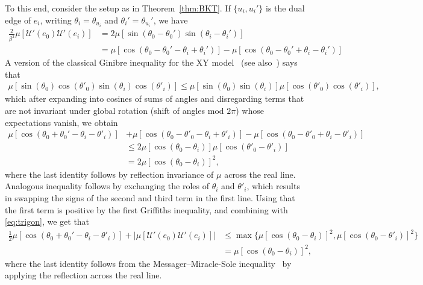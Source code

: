 \documentclass[11pt, reqno]{amsart}
\numberwithin{equation}{section}
\theoremstyle{definition}
\theoremstyle{remark}
\begin{document}
To this end, consider the setup as in Theorem~\ref{thm:BKT}. If $\{u_i,u_i'\}$ is the dual edge of $e_i$, writing $\theta_i=\theta_{u_i}$ and $\theta_i'=\theta_{u_i}'$, we have
\begin{align} \label{eq:trigon}
	\frac2{\beta^2} \mu[\mathcal U'(e_0) \mathcal U'(e_i)] &= 2\mu[\sin(\theta_0-\theta_0') \sin(\theta_i-\theta_i')] 
	\\ &=\mu[\cos(\theta_0-\theta_0'-\theta_i+\theta_i')]-\mu[\cos(\theta_0-\theta_0'+\theta_i-\theta_i')] \nonumber
\end{align}
A version of the classical Ginibre inequality for the XY model~\cite{Gin} (see also~\cite{BLU}) says that
\begin{align*}
	\mu[ \sin ( \theta _0)\cos(\theta'_0) \sin(\theta_i) \cos(\theta'_i) ] \leq \mu[ \sin ( \theta _0) \sin(\theta_i)] \mu[ \cos(\theta'_0)\cos(\theta'_i) ],
\end{align*}
which after expanding into cosines of sums of angles and disregarding terms that are not invariant under global rotation (shift of angles mod $2\pi$) whose expectations vanish,
we obtain
\begin{align*}
	\mu[\cos(\theta_0+\theta_0'-\theta_i-\theta'_i)]& + \mu[\cos(\theta_0-\theta'_0-\theta_i+\theta'_i)]  -\mu[\cos(\theta_0-\theta'_0+\theta_i-\theta'_i)]  \\
	&\leq 2 \mu[ \cos ( \theta _0-\theta_i)] \mu[ \cos(\theta'_0-\theta'_i) ]  \\
	&= 2 \mu[ \cos ( \theta _0-\theta_i)]^2,
\end{align*}
where the last identity follows by reflection invariance of $\mu$ across the real line.
Analogous inequality follows by exchanging the roles of $\theta_i$ and $\theta'_i$, which results in swapping the signs of the second and third term in the first line.
Using that the first term is positive by the first Griffiths inequality, and combining with \eqref{eq:trigon}, we get that
\begin{align} \label{eq: inequality spin-spin}
	\tfrac12\mu[\cos(\theta_0+\theta_0'-\theta_i-\theta'_i)]+|\mu[\mathcal U'(e_0) \mathcal U'(e_i)] | & \leq \max\{ \mu[ \cos ( \theta _0-\theta_i)]^2,\mu[ \cos ( \theta _0-\theta'_i)]^2\} \nonumber
	\\ &= \mu[ \cos ( \theta _0-\theta_i)]^2,
\end{align}
where the last identity follows from the Messager--Miracle-Sole inequality~\cite{MMS} by applying the reflection across the real line.
\end{document}
